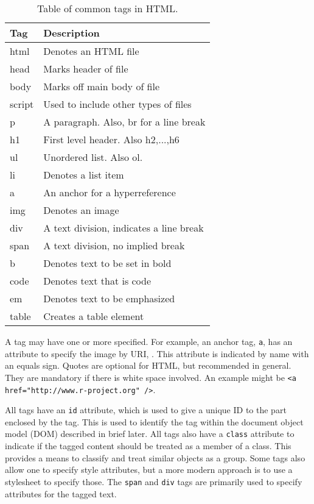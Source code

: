 \begin{table}
\centering
\label{tab:HTML-tags}
\caption{Table of common tags in HTML.}
\begin{tabular}{@{}lp{}@{}}
\toprule

Tag&Description\\
\midrule
html&Denotes an HTML file\\head&Marks header of file\\body&Marks off main body of file\\script&Used to include other types of files\\p&A paragraph. Also, br for a line break\\h1&First level header. Also h2,...,h6\\ul&Unordered list. Also ol.\\li&Denotes a list item\\a&An anchor for a hyperreference\\img&Denotes an image\\div&A text division, indicates a line break\\span&A text division, no implied break\\b&Denotes text to be set in bold\\code&Denotes text that is code\\em&Denotes text to be emphasized\\table&Creates a table element
\\ \bottomrule
\end{tabular}
\end{table}
A tag may have one or more  specified. For example, an
anchor tag, \texttt{a}, has an attribute to specify the image by URI,
. This attribute is indicated by name with an equals
sign. Quotes are optional for HTML, but recommended in general. They
are mandatory if there is white
space involved. An example might be \verb+<a href="http://www.r-project.org" />+.

All tags have an \texttt{id} attribute, which is used to give a unique
ID to the part enclosed by the tag. This is used to identify the tag
within the document object model (DOM) described in brief later. All
tags also have a \texttt{class} attribute to indicate if the tagged
content should be treated as a member of a class. This provides a
means to classify and treat similar objects as a group. Some tags also
allow one to specify style attributes, but a more modern approach is
to use a stylesheet to specify those. The \texttt{span} and \texttt{div} tags are primarily used to specify
attributes for the tagged text.

